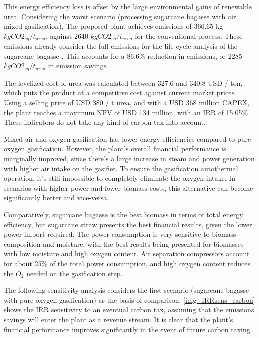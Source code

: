 \documentclass[a4paper, titlepage]{article}
\begin{document}
This energy efficiency loss is offset by the large environmental gains of renewable urea. Considering the worst scenario
(processing sugarcane bagasse with air mixed gasification), The proposed plant achieves emissions of 
366.65 kg $kg CO2_{eq} / t_{urea}$, against 2640 $kg CO2_{eq} / t_{urea}$ for the conventional process. These emissions already
consider the full emissions for the life cycle analysis of the sugarcane bagasse 
\cite{jonkerEconomicPerformanceGHG2019}. This accounts for a 86.6\% reduction in emissions, or 2285 $kg CO2_{eq} / t_{urea}$
in emission savings.

The levelized cost of urea was calculated between 327.6 and 340.8 USD / ton, which puts the product at a
competitive cost against current market prices. Using a selling price of USD 380 / t urea, and with a USD 368 
million CAPEX, the plant reaches a maximum NPV of USD 134 million, with an IRR of 15.05\%. These indicators do not take
any kind of carbon tax into account.

Mixed air and oxygen gasification has lower energy efficiencies compared to pure oxygen gasification. However, 
the plant's overall financial performance is marginally improved, since there's a large increase in steam and power
generation with higher air intake on the gasifier. To ensure the gasification autothermal operation, it's still
impossible to completely eliminate the oxygen intake. In scenarios with higher power and lower biomass costs, 
this alternative can become significantly better and vice-versa.

Comparatively, sugarcane bagasse is the best biomass in terms of total energy efficiency, but sugarcane straw presents
the best financial results, given the lower power import required. The power consumption is very sensitive to biomass
composition and moisture, with the best results being presented for biomasses with low moisture and high oxygen content.
Air separation compressors account for about 25\% of the total power consumption, and high oxygen content reduces
the $O_2$ needed on the gasification step.

The following sensitivity analysis considers the first scenario (sugarcane bagasse with pure oxygen gasification)
as the basis of comparison. \autoref{img_IRRsens_carbon} shows the IRR sensitivity to an eventual carbon tax, 
assuming that the emissions savings will enter the plant as a revenue stream.
It is clear that the plant’s financial performance improves significantly in the event of future carbon taxing.
\end{document}
